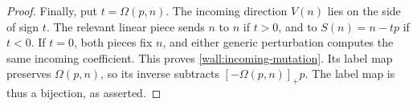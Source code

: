 \begin{proof}
Finally, put $t=\Omega(p,n)$.  The incoming
direction $V(n)$ lies on the side of sign $t$.
The relevant linear piece sends $n$ to $n$ if
$t>0$, and to $S(n)=n-tp$ if $t<0$.  If $t=0$,
both pieces fix $n$, and either generic
perturbation computes the same incoming
coefficient.  This proves
\eqref{wall:incoming-mutation}.  Its label map
preserves $\Omega(p,n)$, so its inverse subtracts
$[-\Omega(p,n)]_+p$.  The label map is thus a
bijection, as asserted.
\end{proof}

